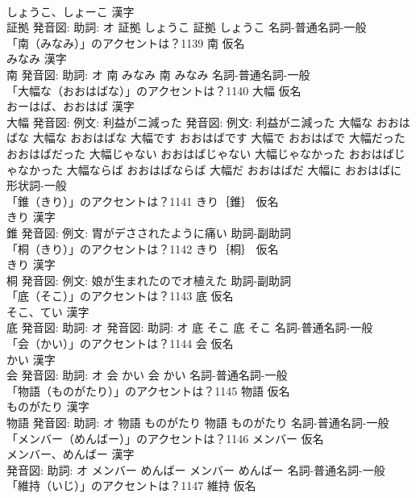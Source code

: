 \documentclass[8pt]{extreport}
\begin{document}
\begin{CJK}{UTF8}{min}
\\	しょうこ、しょーこ 漢字　
\\	証拠 発音図: 助詞: オ	証拠 しょうこ		証拠 しょうこ				名詞-普通名詞-一般 
\\	「南（みなみ）」のアクセントは？1139	南 仮名　
\\	みなみ 漢字　
\\	南 発音図: 助詞: オ	南 みなみ		南 みなみ				名詞-普通名詞-一般 
\\	「大幅な（おおはばな）」のアクセントは？1140	大幅 仮名　
\\	おーはば、おおはば 漢字　
\\	大幅 発音図: 例文: 利益がニ減った 発音図: 例文: 利益がニ減った	大幅な おおはばな		大幅な おおはばな 大幅です おおはばです 大幅で おおはばで 大幅だった おおはばだった 大幅じゃない おおはばじゃない 大幅じゃなかった おおはばじゃなかった 大幅ならば おおはばならば 大幅だ おおはばだ 大幅に おおはばに				形状詞-一般 
\\	「錐（きり）」のアクセントは？1141	きり｛錐｝ 仮名　
\\	きり 漢字　
\\	錐 発音図: 例文: 胃がデさされたように痛い							助詞-副助詞 
\\	「桐（きり）」のアクセントは？1142	きり｛桐｝ 仮名　
\\	きり 漢字　
\\	桐 発音図: 例文: 娘が生まれたのでオ植えた							助詞-副助詞 
\\	「底（そこ）」のアクセントは？1143	底 仮名　
\\	そこ、てい 漢字　
\\	底 発音図: 助詞: オ 発音図: 助詞: オ	底 そこ		底 そこ				名詞-普通名詞-一般 
\\	「会（かい）」のアクセントは？1144	会 仮名　
\\	かい 漢字　
\\	会 発音図: 助詞: オ	会 かい		会 かい				名詞-普通名詞-一般 
\\	「物語（ものがたり）」のアクセントは？1145	物語 仮名　
\\	ものがたり 漢字　
\\	物語 発音図: 助詞: オ	物語 ものがたり		物語 ものがたり				名詞-普通名詞-一般 
\\	「メンバー（めんばー）」のアクセントは？1146	メンバー 仮名　
\\	メンバー、めんばー 漢字　
\\	発音図: 助詞: オ	メンバー めんばー		メンバー めんばー				名詞-普通名詞-一般 
\\	「維持（いじ）」のアクセントは？1147	維持 仮名　

\end{CJK}
\end{document}
